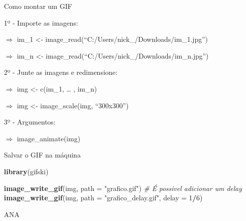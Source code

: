 \documentclass[
  ignorenonframetext,
]{beamer}
\newenvironment{Shaded}{\begin{snugshade}}{\end{snugshade}}
\newcommand{\CommentTok}[1]{\textcolor[rgb]{0.56,0.35,0.01}{\textit{#1}}}
\newcommand{\DataTypeTok}[1]{\textcolor[rgb]{0.13,0.29,0.53}{#1}}
\newcommand{\DecValTok}[1]{\textcolor[rgb]{0.00,0.00,0.81}{#1}}
\newcommand{\KeywordTok}[1]{\textcolor[rgb]{0.13,0.29,0.53}{\textbf{#1}}}
\newcommand{\NormalTok}[1]{#1}
\newcommand{\OperatorTok}[1]{\textcolor[rgb]{0.81,0.36,0.00}{\textbf{#1}}}
\newcommand{\StringTok}[1]{\textcolor[rgb]{0.31,0.60,0.02}{#1}}
\begin{document}
\begin{frame}{Como montar um GIF}
\protect\hypertarget{como-montar-um-gif}{}

1º - Importe as imagens:

\(\Rightarrow\) im\_1 \textless-
image\_read(``C:/Users/nick\_/Downloads/im\_1.jpg'')

\(\Rightarrow\) im\_n \textless-
image\_read(``C:/Users/nick\_/Downloads/im\_n.jpg'')

2º - Junte as imagens e redimensione:

\(\Rightarrow\) img \textless- c(im\_1, \ldots{} , im\_n)

\(\Rightarrow\) img \textless- image\_scale(img, ``300x300'')

3º - Argumentos:

\(\Rightarrow\) image\_animate(img)

\end{frame}

\begin{frame}[fragile]{Salvar o GIF na máquina}
\protect\hypertarget{salvar-o-gif-na-muxe1quina}{}

\begin{Shaded}
\begin{Highlighting}[]
\KeywordTok{library}\NormalTok{(gifski)}

\KeywordTok{image_write_gif}\NormalTok{(img, }\DataTypeTok{path =} \StringTok{"grafico.gif"}\NormalTok{)}
 \CommentTok{# É possivel adicionar um delay}
\KeywordTok{image_write_gif}\NormalTok{(img, }\DataTypeTok{path =} \StringTok{"grafico_delay.gif"}\NormalTok{,}
                \DataTypeTok{delay =} \DecValTok{1}\OperatorTok{/}\DecValTok{6}\NormalTok{)}
\end{Highlighting}
\end{Shaded}

\end{frame}

\begin{frame}[fragile]{ANA}
\protect\hypertarget{ana}{}

\small

\begin{Shaded}
\end{Shaded}

\end{frame}
\end{document}
